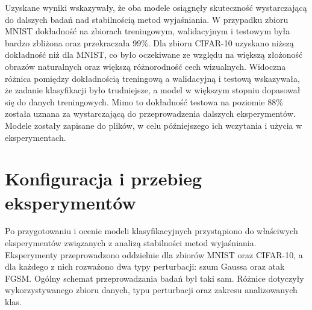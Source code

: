 Uzyskane wyniki wskazywały, że oba modele osiągnęły skuteczność wystarczającą do dalszych badań nad stabilnością metod wyjaśniania. W przypadku zbioru MNIST dokładność na zbiorach treningowym, walidacyjnym i testowym była bardzo zbliżona oraz przekraczała 99\%. Dla zbioru CIFAR-10 uzyskano niższą dokładność niż dla MNIST, co było oczekiwane ze względu na większą złożoność obrazów naturalnych oraz większą różnorodność cech wizualnych. Widoczna różnica pomiędzy dokładnością treningową a walidacyjną i testową wskazywała, że zadanie klasyfikacji było trudniejsze, a model w większym stopniu dopasował się do danych treningowych. Mimo to dokładność testowa na poziomie 88\% została uznana za wystarczającą do przeprowadzenia dalszych eksperymentów. Modele zostały zapisane do plików, w celu późniejszego ich wczytania i użycia w eksperymentach.

\section{Konfiguracja i przebieg eksperymentów}
\label{sec:konfiguracja_i_przebieg_eksperymentow}

Po przygotowaniu i ocenie modeli klasyfikacyjnych przystąpiono do właściwych eksperymentów związanych z analizą stabilności metod wyjaśniania. Eksperymenty przeprowadzono oddzielnie dla zbiorów MNIST oraz CIFAR-10, a dla każdego z nich rozważono dwa typy perturbacji: szum Gaussa oraz atak FGSM. Ogólny schemat przeprowadzania badań był taki sam. Różnice dotyczyły wykorzystywanego zbioru danych, typu perturbacji oraz zakresu analizowanych klas.

